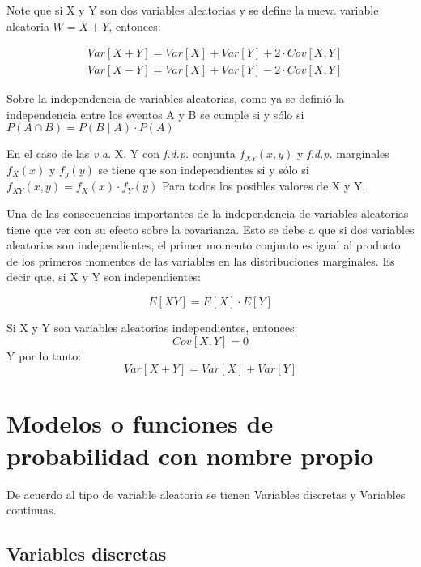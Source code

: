Note que si X y Y son dos variables aleatorias y se define la nueva variable aleatoria $W=X+Y$, entonces:

\begin{align*}
    & Var\left[X+Y \right]=Var\left[X \right]+Var\left[Y\right]+2\cdot Cov \left[X ,Y\right]\\
    &Var\left[X-Y \right]=Var\left[X\right]+Var\left[Y\right]-2\cdot Cov \left[X ,Y\right]
\end{align*}


Sobre la independencia de variables aleatorias, como ya se definió la independencia entre los eventos A y B se cumple si y sólo si $P\left(A\cap B\right) =P\left( B\mid A\right) \cdot P\left(A\right)$

En el caso de las \textit{v.a.} X, Y con \textit{f.d.p.} conjunta $f_{XY}\left( x,y\right)$ y \textit{f.d.p.} marginales
$f_X \left(x\right)$  y $f_y\left(y\right)$ se tiene que son independientes si y sólo si $f_{XY} \left(x,y\right) =f_X\left(x\right) \cdot f_Y\left(y\right) $ Para todos los posibles valores de X y Y.

Una de las consecuencias importantes de la independencia de variables aleatorias tiene que ver con su efecto sobre la covarianza. Esto se debe a que si dos variables aleatorias son independientes, el primer momento conjunto es igual al producto de los primeros momentos de las variables en las distribuciones  marginales. Es decir que, si X y Y son independientes:

\begin{equation}
    E\left[ XY\right]=E\left[ X\right]\cdot E\left[ Y\right]
\end{equation}


Si X y Y son variables aleatorias independientes, entonces:
\begin{equation}
    Cov\left[ X,Y\right]=0
\end{equation}
Y por lo tanto:
\begin{equation}
    Var\left[ X\pm Y\right] = Var\left[ X\right] \pm  Var\left[ Y\right]
\end{equation}

\section{Modelos o funciones de probabilidad con nombre propio}
De acuerdo al tipo de variable aleatoria se tienen Variables discretas y Variables continuas.

\subsection{Variables discretas}

